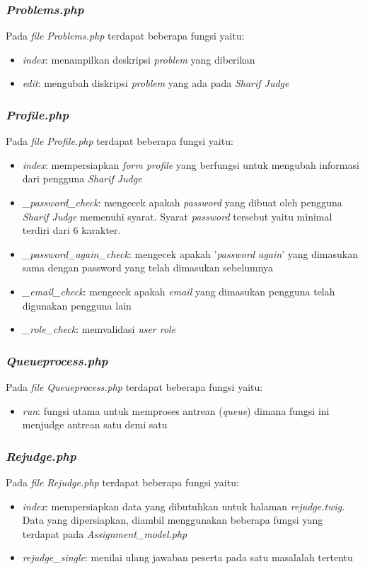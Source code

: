 \subsubsection{\textit{Problems.php}}
Pada \textit{file} \textit{Problems.php} terdapat beberapa fungsi yaitu:
\begin{itemize}
	\item \textit{index}: menampilkan deskripsi \textit{problem} yang diberikan
	\item \textit{edit}: mengubah diskripsi \textit{problem} yang ada pada \textit{Sharif Judge}
\end{itemize}

\subsubsection{\textit{Profile.php}}
Pada \textit{file} \textit{Profile.php} terdapat beberapa fungsi yaitu:
\begin{itemize}
	\item \textit{index}: mempersiapkan \textit{form profile} yang berfungsi untuk mengubah informasi dari pengguna \textit{Sharif Judge}
	\item \textit{\_password\_check}: mengecek apakah \textit{password} yang dibuat oleh pengguna \textit{Sharif Judge} memenuhi syarat. Syarat \textit{password} tersebut yaitu minimal terdiri dari 6 karakter.
	\item \textit{\_password\_again\_check}: mengecek apakah '\textit{password again}' yang dimasukan sama dengan password yang telah dimasukan sebelumnya
	\item \textit{\_email\_check}: mengecek apakah \textit{email} yang dimasukan pengguna telah digunakan pengguna lain
	\item \textit{\_role\_check}: memvalidasi \textit{user role}
\end{itemize}

\subsubsection{\textit{Queueprocess.php}}
Pada \textit{file} \textit{Queueprocess.php} terdapat beberapa fungsi yaitu:
\begin{itemize}
	\item \textit{run}: fungsi utama untuk memproses antrean (\textit{queue}) dimana fungsi ini menjudge antrean satu demi satu
\end{itemize}

\subsubsection{\textit{Rejudge.php}}
Pada \textit{file} \textit{Rejudge.php} terdapat beberapa fungsi yaitu:
\begin{itemize}
	\item \textit{index}: mempersiapkan data yang dibutuhkan untuk halaman \textit{rejudge.twig}. Data yang dipersiapkan, diambil menggunakan beberapa fungsi yang terdapat pada \textit{Assignment\_model.php}
	\item \textit{rejudge\_single}: menilai ulang jawaban peserta pada satu masalalah tertentu
\end{itemize}

